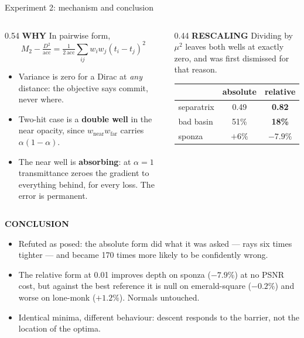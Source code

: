 \documentclass[aspectratio=169,9pt]{beamer}
\makeatletter
\newcommand{\up}[1]{\textcolor{good}{#1}}
\newcommand{\dn}[1]{\textcolor{bad}{#1}}
\newcommand{\code}[1]{{\ttfamily\fontsize{0.92\f@size}{\f@baselineskip}\selectfont #1}}
\newcommand{\lbl}[1]{\textcolor{lblcol}{\scriptsize\bfseries #1}\hspace{0.5em}}
\newcommand{\conc}{\lbl{CONCLUSION}}
\makeatother
\begin{document}
\begin{frame}{Experiment 2: mechanism and conclusion}
  \begin{columns}[T]
    \begin{column}{0.54\textwidth}
      \lbl{WHY} In pairwise form,
      \[ M_2 - \tfrac{D^2}{\mathrm{acc}} = \tfrac{1}{2\,\mathrm{acc}}\textstyle\sum_{ij} w_i w_j (t_i-t_j)^2 \]
      \begin{itemize}\small
        \item Variance is zero for a Dirac at \emph{any} distance: the objective says commit,
              never where.
        \item Two-hit case is a \textbf{double well} in the near opacity, since
              $w_\mathrm{near} w_\mathrm{far}$ carries $\alpha(1-\alpha)$.
        \item The near well is \textbf{absorbing}: at $\alpha=1$ transmittance zeroes the
              gradient to everything behind, for every loss. The error is permanent.
      \end{itemize}
    \end{column}
    \begin{column}{0.44\textwidth}
      \lbl{RESCALING} Dividing by $\mu^2$ leaves both wells at exactly zero, and was first
      dismissed for that reason.
      \begin{center}\small
      \begin{tabular}{lcc}
        \toprule
        & absolute & relative \\
        \midrule
        separatrix & 0.49 & \textbf{0.82} \\
        bad basin & 51\% & \textbf{18\%} \\
        \code{sponza} & \dn{$+6\%$} & \up{$-7.9\%$} \\
        \bottomrule
      \end{tabular}
      \end{center}
    \end{column}
  \end{columns}
  \vspace{0.4em}
  \conc
  \begin{itemize}\small
    \item \dn{Refuted as posed}: the absolute form did what it was asked --- rays six times
          tighter --- and became 170 times more likely to be confidently wrong.
    \item The relative form at 0.01 improves depth on \code{sponza} (\up{$-7.9\%$}) at no PSNR
          cost, but against the best reference it is \dn{null} on \code{emerald-square}
          ($-0.2\%$) and \dn{worse} on \code{lone-monk} ($+1.2\%$). Normals untouched.
    \item Identical minima, different behaviour: descent responds to the barrier, not the
          location of the optima.
  \end{itemize}
\end{frame}
\end{document}
